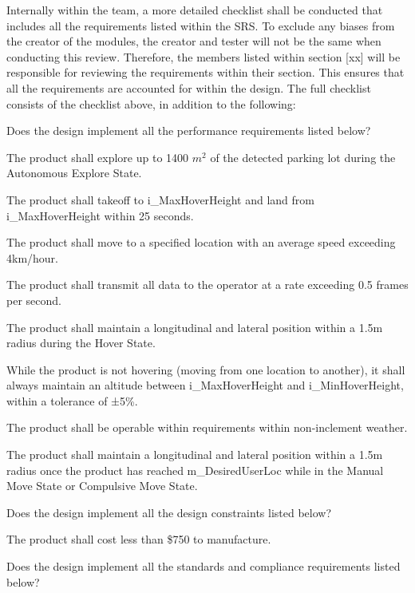 \documentclass[12pt, titlepage]{article}
\begin{document}
Internally within the team, a more detailed checklist shall be conducted that includes all the requirements listed within the SRS. To exclude any biases from the creator of the modules, the creator and tester will not be the same when conducting this review. Therefore, the members listed within section [xx] will be responsible for reviewing the requirements within their section. This ensures that all the requirements are accounted for within the design. The full checklist consists of the checklist above, in addition to the following: 

\begin{todolist}
\label{Design2_Checklist}
\item Does the design implement all the performance requirements listed below?
\begin{todolist}
    \item The product shall explore up to 1400 $m^2$ of the detected parking lot during the Autonomous Explore State.
    \item The product shall takeoff to i\_MaxHoverHeight and land from i\_MaxHoverHeight within 25 seconds.
    \item The product shall move to a specified location with an average speed exceeding 4km/hour.
    \item The product shall transmit all data to the operator at a rate exceeding 0.5 frames per second.
    \item The product shall maintain a longitudinal and lateral position within a 1.5m radius during the Hover State.
    \item While the product is not hovering (moving from one location to another), it shall always maintain an altitude between i\_MaxHoverHeight and i\_MinHoverHeight, within a tolerance of ±5\%.
    \item The product shall be operable within requirements within non-inclement weather.
    \item The product shall maintain a longitudinal and lateral position within a 1.5m radius once the product has reached m\_DesiredUserLoc while in the Manual Move State or Compulsive Move State.
\end{todolist}
\item Does the design implement all the design constraints listed below?
\begin{todolist}
    \item The product shall cost less than \$750 to manufacture.
\end{todolist}
\item Does the design implement all the standards and compliance requirements listed below?

\end{todolist}
\end{document}

